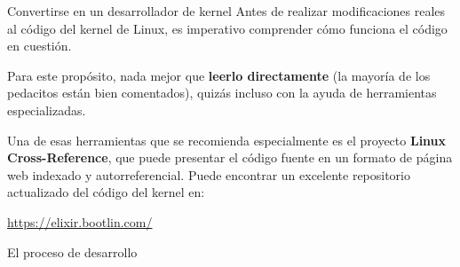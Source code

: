 \begin{frame}[c]{Convertirse en un desarrollador de kernel}
  Antes de realizar modificaciones reales al código del kernel de Linux,
  es imperativo comprender cómo funciona el código en cuestión.

  \vspace{\baselineskip}
  Para este propósito, nada mejor que \textbf{leerlo directamente}
  (la mayoría de los pedacitos están bien comentados), quizás incluso con
  la ayuda de herramientas especializadas.

  \vspace{\baselineskip}
  Una de esas herramientas que se recomienda especialmente es el proyecto
  \textbf{Linux Cross-Reference}, que puede presentar el código fuente en
  un formato de página web indexado y autorreferencial. Puede encontrar
  un excelente repositorio actualizado del código del kernel en:

  \begin{exampleblock}{}
    \begin{center}
      \href{https://elixir.bootlin.com/}{https://elixir.bootlin.com/}
    \end{center}
  \end{exampleblock}
\end{frame}

\begin{frame}[c]{El proceso de desarrollo}
\end{frame}

%
%
